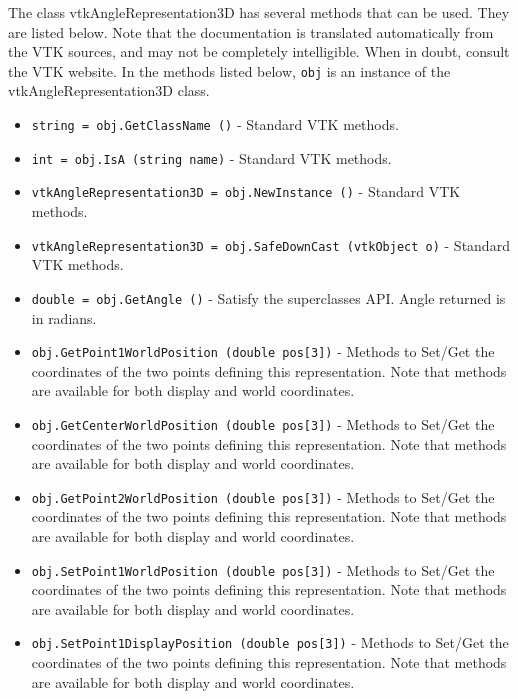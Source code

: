 The class vtkAngleRepresentation3D has several methods that can be used.
  They are listed below.
Note that the documentation is translated automatically from the VTK sources,
and may not be completely intelligible.  When in doubt, consult the VTK website.
In the methods listed below, \verb|obj| is an instance of the vtkAngleRepresentation3D class.
\begin{itemize}
\item  \verb|string = obj.GetClassName ()| -  Standard VTK methods.

\item  \verb|int = obj.IsA (string name)| -  Standard VTK methods.

\item  \verb|vtkAngleRepresentation3D = obj.NewInstance ()| -  Standard VTK methods.

\item  \verb|vtkAngleRepresentation3D = obj.SafeDownCast (vtkObject o)| -  Standard VTK methods.

\item  \verb|double = obj.GetAngle ()| -  Satisfy the superclasses API. Angle returned is in radians.

\item  \verb|obj.GetPoint1WorldPosition (double pos[3])| -  Methods to Set/Get the coordinates of the two points defining
 this representation. Note that methods are available for both
 display and world coordinates.

\item  \verb|obj.GetCenterWorldPosition (double pos[3])| -  Methods to Set/Get the coordinates of the two points defining
 this representation. Note that methods are available for both
 display and world coordinates.

\item  \verb|obj.GetPoint2WorldPosition (double pos[3])| -  Methods to Set/Get the coordinates of the two points defining
 this representation. Note that methods are available for both
 display and world coordinates.

\item  \verb|obj.SetPoint1WorldPosition (double pos[3])| -  Methods to Set/Get the coordinates of the two points defining
 this representation. Note that methods are available for both
 display and world coordinates.

\item  \verb|obj.SetPoint1DisplayPosition (double pos[3])| -  Methods to Set/Get the coordinates of the two points defining
 this representation. Note that methods are available for both
 display and world coordinates.


\end{itemize}
